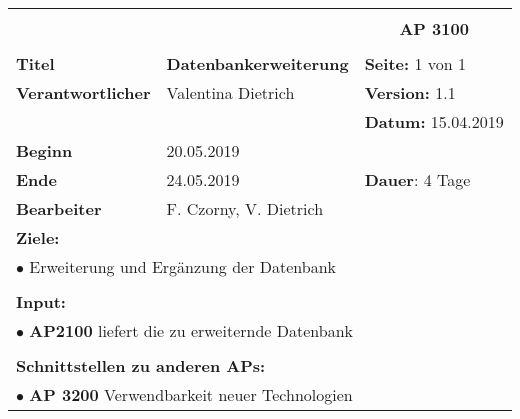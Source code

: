 \clearpage
\begin{table}[!h]
 \begin{center}
  \begin{tabular}{|p{35mm}||p{55mm}|p{50mm}||p{40mm}|}
   \hline
   \multicolumn{3}{|l||}{\textbf{}} & \multicolumn{1}{c|}{}\\
   \multicolumn{3}{|l||}{\textbf{}} & \multicolumn{1}{c|}{\textbf{AP 3100}}\\
   \multicolumn{3}{|l||}{\textbf{}} & \multicolumn{1}{c|}{}\\
   \hline\hline
   \textbf{Titel} & \multicolumn{2}{p{7cm}||}{\textbf{Datenbankerweiterung}} & \textbf{Seite:} 1 von 1\\
   \hline
   \textbf{Verantwortlicher} & \multicolumn{2}{l||}{Valentina Dietrich} & \textbf{Version:} 1.1\\
   \hline
   \multicolumn{3}{|l||}{} & \textbf{Datum:} 15.04.2019\\
   \hline\hline
   \textbf{Beginn} & \multicolumn{2}{l||}{20.05.2019} & \\
   \hline
   \textbf{Ende} & \multicolumn{2}{l||}{24.05.2019} & \textbf{Dauer}: 4 Tage\\
   \hline\hline
   \textbf{Bearbeiter} & \multicolumn{3}{l|}{F. Czorny, V. Dietrich}\\
   \hline\hline
   \multicolumn{4}{|p{150mm}|}{\textbf{Ziele:}}\\
   \multicolumn{4}{|p{150mm}|}{$\bullet$ Erweiterung und Ergänzung der Datenbank}\\
	 \multicolumn{4}{|p{150mm}|}{}\\
   \multicolumn{4}{|p{150mm}|}{\textbf{Input:}}\\
	 \multicolumn{4}{|p{150mm}|}{$\bullet$ \textbf{AP2100} liefert die zu erweiternde Datenbank}\\
   \multicolumn{4}{|p{150mm}|}{}\\
   \multicolumn{4}{|p{150mm}|}{\textbf{Schnittstellen zu anderen APs:}}\\
	 \multicolumn{4}{|p{150mm}|}{$\bullet$ \textbf{AP 3200} Verwendbarkeit neuer Technologien}\\

\end{tabular}
\end{center}
\end{table}
